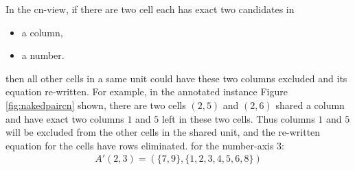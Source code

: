 \documentclass[11pt]{report}
\newcommand{\set}[1]{\{ #1 \}}
\begin{document}
In the cn-view, if there are two cell each has exact two candidates in
\begin{itemize}
\item a column,
\item a number.
\end{itemize}
then all other cells in a same unit could have these two columns excluded and its equation re-written. For example, in the annotated instance Figure \ref{fig:nakedpaircn} shown, there are two cells $(2,5)$ and $(2,6)$ shared a column and have exact two columns $1$ and $5$ left in these two cells. Thus columns $1$ and $5$ will be excluded from the other cells in the shared unit, and the re-written equation for the cells have rows eliminated.
for the number-axis $3$:
\begin{eqnarray*}
A'(2,3) = (\set{7, 9}, \set{1, 2 ,3 ,4 ,5 ,6, 8})\\
\end{eqnarray*}
\end{document}
